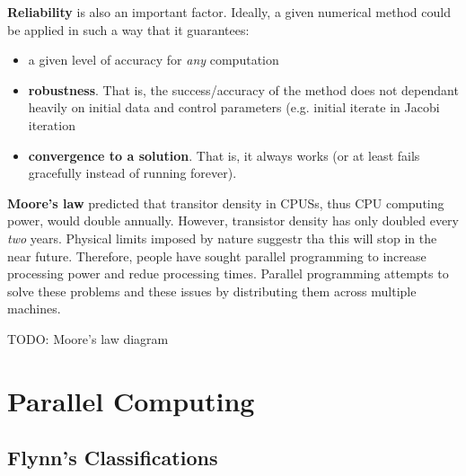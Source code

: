 \documentclass{article}
\begin{document}
\textbf{Reliability} is also an important factor. Ideally, a given numerical method could be applied in such a way that it guarantees:
\begin{itemize}
	\item a given level of accuracy for \textit{any} computation
	\item \textbf{robustness}. That is, the success/accuracy of the method does not dependant heavily on initial data and control parameters (e.g. initial iterate in Jacobi iteration
	\item \textbf{convergence to a solution}. That is, it always works (or at least fails gracefully instead of running forever).
\end{itemize}

\textbf{Moore's law} predicted that transitor density in CPUSs, thus CPU computing power, would double annually. However, transistor density has only doubled every \textit{two} years. Physical limits imposed by nature suggestr tha this will stop in the near future. Therefore, people have sought parallel programming to increase processing power and redue processing times. Parallel programming attempts to solve these problems and these issues by distributing them across multiple machines.

TODO: Moore's law diagram

\section{Parallel Computing}

\subsection{Flynn's Classifications}
\end{document}
